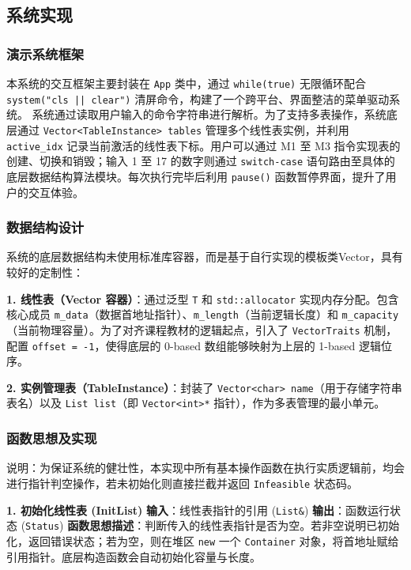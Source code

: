 \documentclass[supercite]{Experimental_Report}
\theoremstyle{definition}
\begin{document}
\subsection{系统实现}

\subsubsection{演示系统框架}
本系统的交互框架主要封装在 \texttt{App} 类中，通过 \texttt{while(true)} 无限循环配合 \texttt{system("cls || clear")} 清屏命令，构建了一个跨平台、界面整洁的菜单驱动系统。
系统通过读取用户输入的命令字符串进行解析。为了支持多表操作，系统底层通过 \texttt{Vector<TableInstance> tables} 管理多个线性表实例，并利用 \texttt{active\_idx} 记录当前激活的线性表下标。用户可以通过 M1 至 M3 指令实现表的创建、切换和销毁；输入 1 至 17 的数字则通过 \texttt{switch-case} 语句路由至具体的底层数据结构算法模块。每次执行完毕后利用 \texttt{pause()} 函数暂停界面，提升了用户的交互体验。

\subsubsection{数据结构设计}
系统的底层数据结构未使用标准库容器，而是基于自行实现的模板类Vector，具有较好的定制性：

\textbf{1. 线性表（Vector 容器）}：通过泛型 \texttt{T} 和 \texttt{std::allocator} \cite{cppref} 实现内存分配。包含核心成员 \texttt{m\_data}（数据首地址指针）、\texttt{m\_length}（当前逻辑长度）和 \texttt{m\_capacity}（当前物理容量）。为了对齐课程教材的逻辑起点，引入了 \texttt{VectorTraits} 机制，配置 \texttt{offset = -1}，使得底层的 0-based 数组能够映射为上层的 1-based 逻辑位序。

\textbf{2. 实例管理表（TableInstance）}：封装了 \texttt{Vector<char> name}（用于存储字符串表名）以及 \texttt{List list}（即 \texttt{Vector<int>*} 指针），作为多表管理的最小单元。

\subsubsection{函数思想及实现}
说明：为保证系统的健壮性，本实现中所有基本操作函数在执行实质逻辑前，均会进行指针判空操作，若未初始化则直接拦截并返回 \texttt{Infeasible} 状态码。

\vspace{0.5em}
\noindent\textbf{1. 初始化线性表 (InitList)}
\newline\textbf{输入}：线性表指针的引用 (\texttt{List\&})
\newline\textbf{输出}：函数运行状态 (\texttt{Status})
\newline\textbf{函数思想描述}：判断传入的线性表指针是否为空。若非空说明已初始化，返回错误状态；若为空，则在堆区 \texttt{new} 一个 \texttt{Container} 对象，将首地址赋给引用指针。底层构造函数会自动初始化容量与长度。
\end{document}
